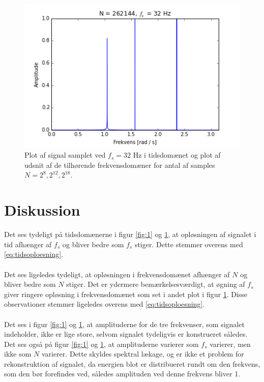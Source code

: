 \begin{figure}[H]
\begin{minipage}{0.49\textwidth}
\includegraphics[width=\textwidth]{figures/frekvensanalyse/freq_32hz_N262144.png}
\end{minipage}
\caption{Plot af signal samplet ved $f_s=32$ Hz i tidsdomænet og plot af udsnit af de tilhørende frekvensdomæner for antal af samples $N=2^8, 2^{12}, 2^{18}$.}
\label{fig:2}
\end{figure}

\section{Diskussion}
Det ses tydeligt på tidsdomænerne i figur \ref{fig:1} og \ref{fig:2}, at opløsningen af signalet i tid afhænger af $f_s$ og bliver bedre som $f_s$ stiger. Dette stemmer overens med \eqref{eq:tidsoploesning}.
\\ \\
Det ses ligeledes tydeligt, at opløsningen i frekvensdomænet afhænger af $N$ og bliver bedre som $N$ stiger. Det er ydermere bemærkelsesværdigt, at øgning af $f_s$ giver ringere opløsning i frekvensdomænet som set i andet plot i figur \ref{fig:2}. Disse observationer stemmer ligeledes overens med \eqref{eq:tidsoploesning}.
\\ \\
Det ses i figur \ref{fig:1} og \ref{fig:2}, at amplituderne for de tre frekvenser, som signalet indeholder, ikke er lige store, selvom signalet tydeligvis er konstrueret således. Det ses også på figur \ref{fig:1} og \ref{fig:2}, at amplituderne varierer som $f_s$ varierer, men ikke som $N$ varierer. Dette skyldes spektral lækage, og er ikke et problem for rekonstruktion af signalet, da energien blot er distribueret rundt om den frekvens, som den bør forefindes ved, således amplituden ved denne frekvens bliver 1.


